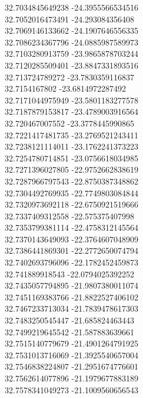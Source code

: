 {32.7034845649238	-24.3955566534516\\
32.7052016473491	-24.293084356408\\
32.7069146133662	-24.1907646556335\\
32.7086234367796	-24.0885987589973\\
32.7103280913759	-23.9865878703244\\
32.7120285509401	-23.8847331893516\\
32.713724789272	-23.7830359116837\\
32.7154167802	-23.6814972287492\\
32.7171044975949	-23.5801183277578\\
32.7187879153817	-23.4789003916564\\
32.720467007552	-23.3778445990865\\
32.7221417481735	-23.2769521243411\\
32.7238121114011	-23.1762241373223\\
32.7254780714851	-23.0756618034985\\
32.7271396027805	-22.9752662838619\\
32.7287966797543	-22.8750387348862\\
32.7304492769935	-22.7749803084844\\
32.7320973692118	-22.6750921519666\\
32.7337409312558	-22.575375407998\\
32.7353799381114	-22.4758312145564\\
32.7370143649093	-22.3764607048909\\
32.7386441869301	-22.2772650074794\\
32.7402693796096	-22.1782452459873\\
32.741889918543	-22.0794025392252\\
32.7435057794895	-21.9807380011074\\
32.7451169383766	-21.8822527406102\\
32.7467233713034	-21.7839478617303\\
32.7483250545447	-21.685824463443\\
32.7499219645542	-21.587883639661\\
32.7515140779679	-21.4901264791925\\
32.7531013716069	-21.3925540657004\\
32.7546838224807	-21.2951674776601\\
32.7562614077896	-21.1979677883189\\
32.7578341049273	-21.1009560656543\\
}
